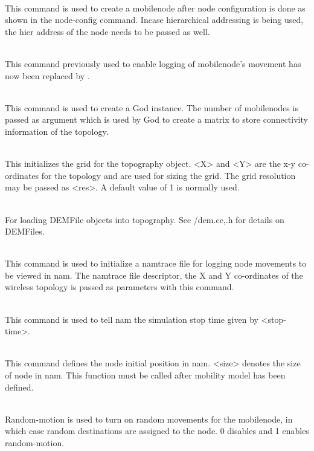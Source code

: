 \begin{flushleft}
\\
This command is used to create a mobilenode after node configuration is done
as shown in the node-config command. Incase hierarchical addressing is being
used, the hier address of the node needs to be passed as well.


\\
This command previously used to enable logging of mobilenode's movement has now
been replaced by .


\\
This command is used to create a God instance. The number of mobilenodes
is passed as argument which is used by God to create a matrix to store
connectivity information of the topology.


\\
This initializes the grid for the topography object. <X> and <Y> are the x-y
co-ordinates for the topology and are used for sizing the grid. The grid
resolution may be passed as <res>. A default value of 1 is normally used.


\\
For loading DEMFile objects into topography. See \ns/dem.{cc,.h} for details on
DEMFiles.


\\
This command is used to initialize a namtrace file for logging node movements
to be viewed in nam. The namtrace file descriptor, the X and Y 
co-ordinates of the wireless topology is passed as parameters with
this command.


\\
This command is used to tell nam the simulation stop time given by <stop-time>.


\\
This command defines the node initial position in nam. <size> denotes the size
of node in nam. This function must be called after mobility model has been
defined.


\\
Random-motion is used to turn on random movements for the mobilenode, in which
case random destinations are assigned to the node. 0 disables and 1 enables
random-motion.



\end{flushleft}
